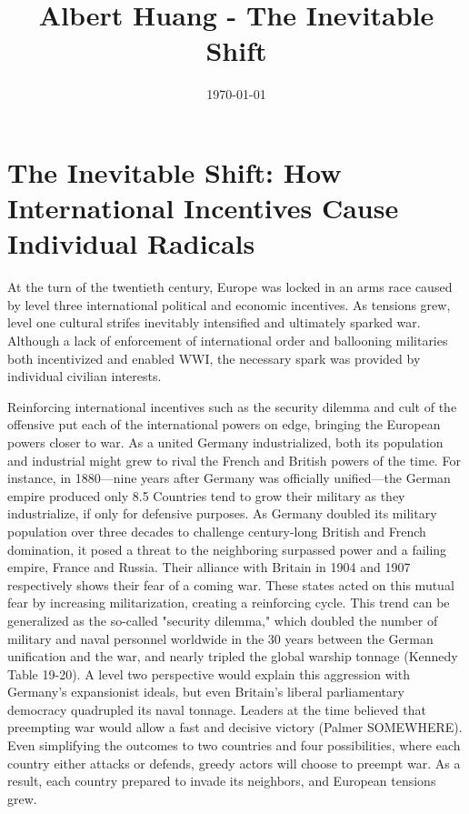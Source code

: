 \documentclass[11pt]{article}
\date{\today}
\title{Albert Huang - The Inevitable Shift}
\begin{document}
\maketitle
\tableofcontents

\setlength\parindent{30pt}

\section{The Inevitable Shift: How International Incentives Cause Individual Radicals}
\label{sec:org3bb2848}

  \begin{doublespacing}

 At the turn of the twentieth century, Europe was locked in an arms race caused by level three international political and economic incentives. As tensions grew, level one cultural strifes inevitably intensified and ultimately sparked war.
 Although a lack of enforcement of international order and ballooning militaries both incentivized and enabled WWI, the necessary spark was provided by individual civilian interests.

 Reinforcing international incentives such as the security dilemma and cult of the offensive put each of the international powers on edge, bringing the European powers closer to war.
 As a united Germany industrialized, both its population and industrial might grew to rival the French and British powers of the time. For instance, in 1880—nine years after Germany was officially unified—the German empire produced only 8.5%
 Countries tend to grow their military as they industrialize, if only for defensive purposes. As Germany doubled its military population over three decades to challenge century-long British and French domination, it posed a threat to the neighboring surpassed power and a failing empire, France and Russia. Their alliance with Britain in 1904 and 1907 respectively shows their fear of a coming war. These states acted on this mutual fear by increasing militarization, creating a reinforcing cycle.
  This trend can be generalized as the so-called "security dilemma," which doubled the number of military and naval personnel worldwide in the 30 years between the German unification and the war, and nearly tripled the global warship tonnage (Kennedy Table 19-20). A level two perspective would explain this aggression with Germany's expansionist ideals, but even Britain's liberal parliamentary democracy quadrupled its naval tonnage.
  Leaders at the time believed that preempting war would allow a fast and decisive victory (Palmer SOMEWHERE). Even simplifying the outcomes to two countries and four possibilities, where each country either attacks or defends, greedy actors will choose to preempt war. As a result, each country prepared to invade its neighbors, and European tensions grew.

\end{doublespacing}
\end{document}
